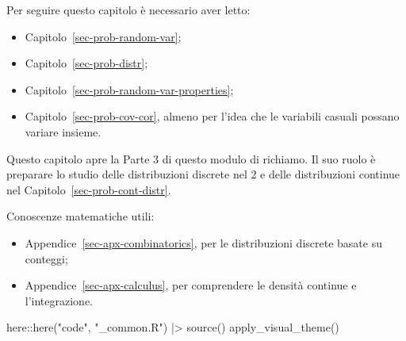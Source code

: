\documentclass[
  italian,
  letterpaper,
  a4paper,
  11pt,
  open=any]{scrbook}
\newenvironment{Shaded}{\begin{snugshade}}{\end{snugshade}}
\newcommand{\FunctionTok}[1]{\textcolor[rgb]{0.28,0.35,0.67}{#1}}
\newcommand{\NormalTok}[1]{\textcolor[rgb]{0.00,0.23,0.31}{#1}}
\newcommand{\SpecialCharTok}[1]{\textcolor[rgb]{0.37,0.37,0.37}{#1}}
\newcommand{\StringTok}[1]{\textcolor[rgb]{0.13,0.47,0.30}{#1}}
\providecommand{\tightlist}{%
  \setlength{\itemsep}{0pt}\setlength{\parskip}{0pt}}
\theoremstyle{plain}
\theoremstyle{definition}
\theoremstyle{definition}
\theoremstyle{remark}
\begin{document}
\begin{tcolorbox}[enhanced jigsaw, arc=.35mm, bottomrule=.15mm, bottomtitle=1mm, breakable, colback=white, colbacktitle=quarto-callout-tip-color!10!white, colframe=quarto-callout-tip-color-frame, coltitle=black, left=2mm, leftrule=.75mm, opacityback=0, opacitybacktitle=0.6, rightrule=.15mm, title=\textcolor{quarto-callout-tip-color}{\faLightbulb}\hspace{0.5em}{Prerequisiti}, titlerule=0mm, toprule=.15mm, toptitle=1mm]

Per seguire questo capitolo è necessario aver letto:

\begin{itemize}
\tightlist
\item
  Capitolo~\ref{sec-prob-random-var};
\item
  Capitolo~\ref{sec-prob-distr};
\item
  Capitolo~\ref{sec-prob-random-var-properties};
\item
  Capitolo~\ref{sec-prob-cov-cor}, almeno per l'idea che le variabili
  casuali possano variare insieme.
\end{itemize}

Questo capitolo apre la Parte 3 di questo modulo di richiamo. Il suo
ruolo è preparare lo studio delle distribuzioni discrete nel 2 e delle
distribuzioni continue nel Capitolo~\ref{sec-prob-cont-distr}.

Conoscenze matematiche utili:

\begin{itemize}
\tightlist
\item
  Appendice~\ref{sec-apx-combinatorics}, per le distribuzioni discrete
  basate su conteggi;
\item
  Appendice~\ref{sec-apx-calculus}, per comprendere le densità continue
  e l'integrazione.
\end{itemize}

\end{tcolorbox}

\begin{tcolorbox}[enhanced jigsaw, arc=.35mm, bottomrule=.15mm, bottomtitle=1mm, breakable, colback=white, colbacktitle=quarto-callout-caution-color!10!white, colframe=quarto-callout-caution-color-frame, coltitle=black, left=2mm, leftrule=.75mm, opacityback=0, opacitybacktitle=0.6, rightrule=.15mm, title=\textcolor{quarto-callout-caution-color}{\faFire}\hspace{0.5em}{Preparazione del Notebook}, titlerule=0mm, toprule=.15mm, toptitle=1mm]

\begin{Shaded}
\begin{Highlighting}[]
\NormalTok{here}\SpecialCharTok{::}\FunctionTok{here}\NormalTok{(}\StringTok{"code"}\NormalTok{, }\StringTok{"\_common.R"}\NormalTok{) }\SpecialCharTok{|\textgreater{}} 
  \FunctionTok{source}\NormalTok{()}
\FunctionTok{apply\_visual\_theme}\NormalTok{()}
\end{Highlighting}
\end{Shaded}

\end{tcolorbox}
\end{document}
